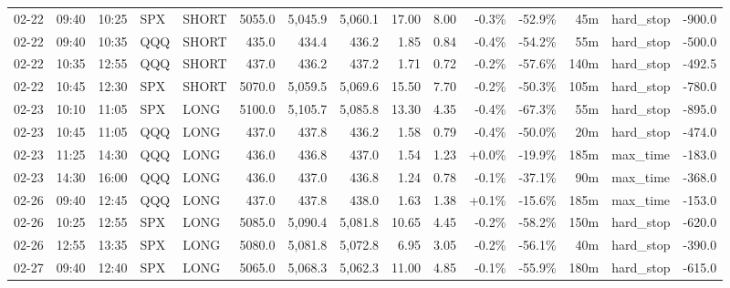 \documentclass[11pt,a4paper,twoside]{article}
\begin{document}
\begin{landscape}
\begin{center}
\begin{longtable}{>{\color{txtmain}}l l l l l r r r r r r r r >{\color{txtmain}}l r}
02-22 & 09:40 & 10:25 & SPX & SHORT & 5055.0 & 5,045.9 & 5,060.1 & 17.00 & 8.00 & \textcolor{lossred}{-0.3\%} & \textcolor{lossred}{-52.9\%} & 45m & hard\_stop & \textcolor{lossred}{-900.0} \\
02-22 & 09:40 & 10:35 & QQQ & SHORT & 435.0 & 434.4 & 436.2 & 1.85 & 0.84 & \textcolor{lossred}{-0.4\%} & \textcolor{lossred}{-54.2\%} & 55m & hard\_stop & \textcolor{lossred}{-500.0} \\
02-22 & 10:35 & 12:55 & QQQ & SHORT & 437.0 & 436.2 & 437.2 & 1.71 & 0.72 & \textcolor{lossred}{-0.2\%} & \textcolor{lossred}{-57.6\%} & 140m & hard\_stop & \textcolor{lossred}{-492.5} \\
02-22 & 10:45 & 12:30 & SPX & SHORT & 5070.0 & 5,059.5 & 5,069.6 & 15.50 & 7.70 & \textcolor{lossred}{-0.2\%} & \textcolor{lossred}{-50.3\%} & 105m & hard\_stop & \textcolor{lossred}{-780.0} \\
02-23 & 10:10 & 11:05 & SPX & LONG & 5100.0 & 5,105.7 & 5,085.8 & 13.30 & 4.35 & \textcolor{lossred}{-0.4\%} & \textcolor{lossred}{-67.3\%} & 55m & hard\_stop & \textcolor{lossred}{-895.0} \\
02-23 & 10:45 & 11:05 & QQQ & LONG & 437.0 & 437.8 & 436.2 & 1.58 & 0.79 & \textcolor{lossred}{-0.4\%} & \textcolor{lossred}{-50.0\%} & 20m & hard\_stop & \textcolor{lossred}{-474.0} \\
02-23 & 11:25 & 14:30 & QQQ & LONG & 436.0 & 436.8 & 437.0 & 1.54 & 1.23 & \textcolor{wingreen}{+0.0\%} & \textcolor{lossred}{-19.9\%} & 185m & max\_time & \textcolor{lossred}{-183.0} \\
02-23 & 14:30 & 16:00 & QQQ & LONG & 436.0 & 437.0 & 436.8 & 1.24 & 0.78 & \textcolor{lossred}{-0.1\%} & \textcolor{lossred}{-37.1\%} & 90m & max\_time & \textcolor{lossred}{-368.0} \\
02-26 & 09:40 & 12:45 & QQQ & LONG & 437.0 & 437.8 & 438.0 & 1.63 & 1.38 & \textcolor{wingreen}{+0.1\%} & \textcolor{lossred}{-15.6\%} & 185m & max\_time & \textcolor{lossred}{-153.0} \\
02-26 & 10:25 & 12:55 & SPX & LONG & 5085.0 & 5,090.4 & 5,081.8 & 10.65 & 4.45 & \textcolor{lossred}{-0.2\%} & \textcolor{lossred}{-58.2\%} & 150m & hard\_stop & \textcolor{lossred}{-620.0} \\
02-26 & 12:55 & 13:35 & SPX & LONG & 5080.0 & 5,081.8 & 5,072.8 & 6.95 & 3.05 & \textcolor{lossred}{-0.2\%} & \textcolor{lossred}{-56.1\%} & 40m & hard\_stop & \textcolor{lossred}{-390.0} \\
02-27 & 09:40 & 12:40 & SPX & LONG & 5065.0 & 5,068.3 & 5,062.3 & 11.00 & 4.85 & \textcolor{lossred}{-0.1\%} & \textcolor{lossred}{-55.9\%} & 180m & hard\_stop & \textcolor{lossred}{-615.0} \\

\end{longtable}
\end{center}
\end{landscape}
\end{document}
